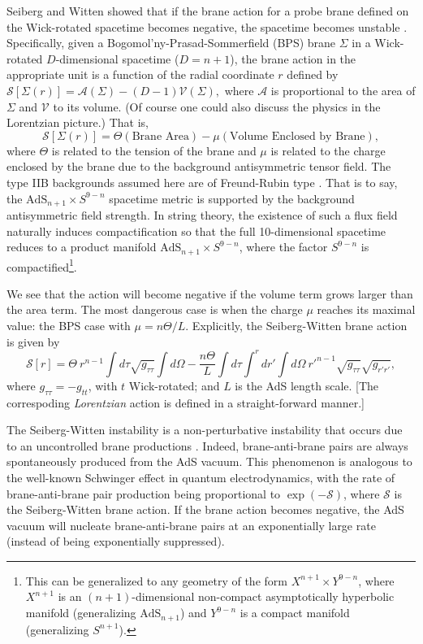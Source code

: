 \documentclass[12pt]{article}
\newcommand{\2}{$^2$}
\newcommand{\3}{$^3$}
\newcommand{\4}{$_4$}
\newcommand{\5}{$_5$}
\begin{document}
Seiberg and Witten showed that if the brane action for a probe brane defined on the Wick-rotated spacetime becomes negative, the spacetime becomes unstable \cite{kn:seiberg, KPR, Barbon, 1411.1887}. 
Specifically, given a Bogomol'ny-Prasad-Sommerfield (BPS) brane $\Sigma$ in a Wick-rotated $D$-dimensional spacetime ($D=n+1$), the brane action in the appropriate unit is a function of the radial coordinate $r$ defined by
$
\mathcal{S}[\Sigma(r)] = \mathcal{A}(\Sigma) - (D-1)\mathcal{V}(\Sigma),
$
where $\mathcal{A}$ is proportional to the area of $\Sigma$ and $\mathcal{V}$ to its volume. (Of course one could also discuss the physics in the Lorentzian picture.)
That is,
\begin{equation}\label{SWaction}
\mathcal{S}[\Sigma(r)]=\Theta (\text{Brane Area}) - \mu (\text{Volume Enclosed by Brane}),
\end{equation}
where $\Theta$ is related to the tension of the brane and $\mu$ is related to the charge enclosed by the brane due to the background antisymmetric tensor field. The type IIB backgrounds
assumed here are of Freund-Rubin type \cite{FR}. That is to say, the $\text{AdS}_{n+1} \times S^{9-n}$ spacetime metric is supported by the background antisymmetric field strength. In string theory, the existence of such a flux field naturally induces compactification so that the full 10-dimensional spacetime reduces to a product manifold $\text{AdS}_{n+1} \times S^{9-n}$, where the factor $S^{9-n}$ is compactified\footnote{This can be generalized to any geometry of the form $X^{n+1} \times Y^{9-n}$, where $X^{n+1}$ is an $(n+1)$-dimensional non-compact asymptotically hyperbolic manifold (generalizing $\text{AdS}_{n+1}$) and $Y^{9-n}$ is a compact manifold (generalizing $S^{n+1}$).}.   

We see that the action will become negative if the volume term grows larger than the area term. The most dangerous case is when the charge $\mu$ reaches its maximal value: the BPS case with $\mu=n\Theta/L$. Explicitly, the Seiberg-Witten brane action is given by
\begin{equation}
\mathcal{S}[r]= \Theta ~r^{n-1} \int d\tau \sqrt{g_{\tau\tau}} \int d\Omega  - 
\frac{n\Theta}{L} \int d\tau \int^r dr' \int d\Omega ~r'^{n-1}\sqrt{g_{\tau \tau}}\sqrt{g_{r'r'}},
\end{equation} 
where $g_{\tau\tau}=-g_{tt}$, with $t$ Wick-rotated; and $L$ is the AdS length scale.
[The correspoding \emph{Lorentzian} action is defined in a straight-forward manner.]

The Seiberg-Witten instability is a non-perturbative instability that occurs due to an uncontrolled brane productions \cite{kn:seiberg, KPR}. Indeed, brane-anti-brane pairs are always spontaneously produced from the AdS vacuum. This phenomenon is analogous to the well-known Schwinger effect in quantum electrodynamics, with the rate of brane-anti-brane pair production being proportional to $\exp(-\mathcal{S})$, where $\mathcal{S}$ is the Seiberg-Witten brane action. If the brane action becomes negative, the AdS vacuum will nucleate brane-anti-brane pairs at an exponentially large rate (instead of being exponentially suppressed).  
\end{document}
